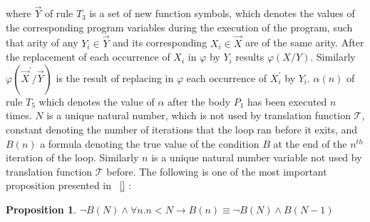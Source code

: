 \documentclass{article}
\newtheorem{prop}{Proposition}
\begin{document}
where $\vec{Y}$ of rule $T_3$ is a set of new function symbols, which denotes the values of the corresponding program variables during the execution of the program, such that arity of any $Y_i\in\vec{Y}$ and its corresponding $X_i\in \vec{X}$ are of the same arity. After the replacement of each occurrence of $X_i$ in $\varphi$ by $Y_i$ results $\varphi(X/Y)$. Similarly  $\varphi(\vec{X}^{\prime}/\vec{Y})$ is the result of replacing in $\varphi$ each occurrence of $X_{i}^{\prime}$ by $Y_i$. $\alpha(n)$ of rule $T_5$
which denotes the value of $\alpha$ after the body $P_1$ has been executed $n$ times. $N$ is a unique natural number, which is not used by translation function $\mathcal{T}$, constant denoting the number of iterations that the loop ran before it exits, and $B(n)$ a formula denoting the true value of the condition $B$ at the end of the $n^{th}$ iteration of the loop. Similarly $n$
is a unique natural number variable not used by translation function $\mathcal{T}$ before. The following is 
one of the most important proposition presented in ~\ref{} :
\begin{prop}\label{propostion1}
$\neg B(N) \land \forall n.n<N \rightarrow B(n) \equiv \neg B(N) \land B(N-1)$
\end{prop}
\end{document}
